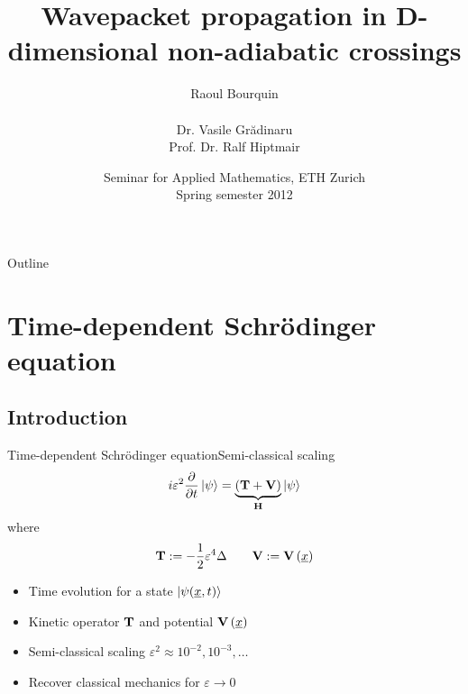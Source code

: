 \documentclass{beamer}
\title[Wavepackets]{Wavepacket propagation in D-dimensional non-adiabatic crossings}
\author[]{Raoul Bourquin\\~\\ Dr. Vasile Gr\u{a}dinaru\\ Prof. Dr. Ralf Hiptmair}
\date{Seminar for Applied Mathematics, ETH Zurich \\Spring semester 2012}
\begin{document}
\begin{frame}
  \titlepage
\end{frame}


\begin{frame}{Outline}
  \tableofcontents
\end{frame}


\section{Time-dependent Schrödinger equation}
\subsection{Introduction}


\begin{frame}{Time-dependent Schrödinger equation}{Semi-classical scaling}
  \begin{equation*} \label{eq:basics_tdse_semi}
    i \varepsilon^2 \frac{\partial}{\partial t} \Ket{\psi} = \underbrace{\left(\mat{T}+\mat{V}\right)}_{\mat{H}} \Ket{\psi}
  \end{equation*}
  where
  \begin{equation*}
    \mat{T} \assign - \frac{1}{2} \varepsilon^4 \Delta \qquad
    \mat{V} \assign \mat{V}\ofs{\vec{x}}
  \end{equation*}
  \begin{itemize}
  \item Time evolution for a state $\Ket{\psi(\vec{x}, t)}$
  \item Kinetic operator $\mat{T}$ and potential $\mat{V}\left(\vec{x}\right)$
  \item Semi-classical scaling $\varepsilon^2 \approx 10^{-2}, 10^{-3}, \ldots$
  \item Recover classical mechanics for $\varepsilon \rightarrow 0$
  \end{itemize}
\end{frame}
\end{document}
